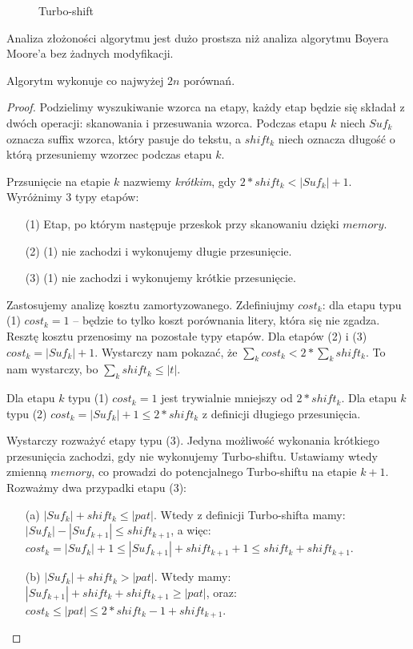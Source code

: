 \begin{figure}[h]
		
  \caption{Turbo-shift}
  \label{turboshift}
\end{figure}

Analiza złożoności algorytmu \TBM jest dużo prostsza niż analiza algorytmu Boyera Moore'a bez żadnych modyfikacji.

\begin{theorem}{}{}
	Algorytm \TBM wykonuje co najwyżej $2n$ porównań.
\end{theorem}

\begin{proof}
	Podzielimy wyszukiwanie wzorca na etapy, każdy etap będzie się składał z dwóch operacji: skanowania i przesuwania wzorca. Podczas etapu $k$ niech $Suf_k$ oznacza suffix wzorca, który pasuje do tekstu, a $shift_k$ niech oznacza długość o którą przesuniemy wzorzec podczas etapu $k$.

	Przsunięcie na etapie $k$ nazwiemy \emph{krótkim}, gdy $2*shift_k < |Suf_k| + 1$. Wyróżnimy 3 typy etapów:
	\begin{itemize}
		\item[(1)] Etap, po którym następuje przeskok przy skanowaniu dzięki $memory$.
		\item[(2)] (1) nie zachodzi i wykonujemy długie przesunięcie.
		\item[(3)] (1) nie zachodzi i wykonujemy krótkie przesunięcie. 
	\end{itemize}

	Zastosujemy analizę kosztu zamortyzowanego. Zdefiniujmy $cost_k$: dla etapu typu (1) $cost_k = 1$ -- będzie to tylko koszt porównania litery, która się nie zgadza. Resztę kosztu przenosimy na pozostałe typy etapów. Dla etapów (2) i (3) $cost_k = |Suf_k| + 1$. Wystarczy nam pokazać, że $\sum_k cost_k < 2* \sum_k shift_k$. To nam wystarczy, bo $\sum_k shift_k \leq |t|$.

	Dla etapu $k$ typu (1) $cost_k = 1$ jest trywialnie mniejszy od $2 * shift_k$. Dla etapu $k$ typu (2) $cost_k = |Suf_k| + 1 \leq 2 * shift_k$ z definicji długiego przesunięcia.

	Wystarczy rozważyć etapy typu (3). Jedyna możliwość wykonania krótkiego przesunięcia zachodzi, gdy nie wykonujemy Turbo-shiftu. Ustawiamy wtedy zmienną $memory$, co prowadzi do potencjalnego Turbo-shiftu na etapie $k+1$. Rozważmy dwa przypadki etapu (3):
	\begin{itemize}
		\item [(a)] $|Suf_k| + shift_k \leq |pat|$. Wtedy z definicji Turbo-shifta mamy: $|Suf_k| - |Suf_{k+1}| \leq shift_{k+1}$, a więc: $cost_k = |Suf_{k}|+1 \leq |Suf_{k+1}| + shift_{k+1} + 1 \leq shift_k + shift_{k+1}$.
		\item [(b)] $|Suf_k| + shift_k > |pat|$. Wtedy mamy: $|Suf_{k+1}| + shift_k + shift_{k+1} \geq |pat|$, oraz: $cost_k \leq |pat| \leq 2 * shift_k -1 + shift_{k+1}$.
	\end{itemize}


\end{proof}
